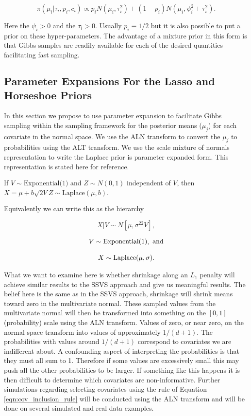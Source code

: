 \begin{equation}
\pi(\mu_i\vert \tau_i, p_i, c_i) \propto p_iN(\mu_i, \tau_i^2)+(1-p_i)N(\mu_i, \psi^2_i+\tau_i^2).
\end{equation}

Here the $\psi_i >0$ and the $\tau_i>0$. Usually $p_i\equiv1/2$ but it is also possible to put a prior on these hyper-parameters. The advantage of a mixture prior in this form is that Gibbs samples are readily available for each of the desired quantities facilitating fast sampling.     

\subsection{Parameter Expansions For the Lasso and Horseshoe Priors}
In this section we propose to use parameter expansion to facilitate Gibbs sampling within the sampling framework for the posterior means ($\mu_j$) for each covariate in the normal space. We use the ALN transform to convert the $\mu_j$ to probabilities using the ALT transform. 
We use the scale mixture of normals representation to write the Laplace prior is parameter expanded form. This representation is stated here for reference.

If $V \sim \text{Exponential(1)}$ and $Z \sim N(0, 1)$ independent of $V$, then $X = \mu + b \sqrt{2 V}Z \sim \mathrm{Laplace}(\mu,b)$. 

Equivalently we can write this as the hierarchy

\begin{equation}\label{eqn:normal_cond_lhood_lasso}
X \vert V \sim N[\mu, \sigma^22V],
\end{equation}

\begin{equation}\newnot{symbol:exponential_dist}
V \sim \text{Exponential}(1), \text{ and}
\end{equation}

\begin{equation}\newnot{symbol:laplace_dist}
X \sim \text{Laplace}(\mu, \sigma).
\end{equation}

What we want to examine here is whether shrinkage along an $L_1$ penalty will achieve similar results to the SSVS approach and give us meaningful results. The belief here is the same as in the SSVS approach, shrinkage will shrink means toward zero in the multivariate normal. These sampled values from the multivariate normal will then be transformed into something on the $[0,1]$ (probability) scale using the ALN transform. Values of zero, or near zero, on the normal space transform into values of approximately $1/(d+1)$. The probabilities with values around $1/(d+1)$ correspond to covariates we are indifferent about. A confounding aspect of interpreting the probabilities is that they must all sum to 1. Therefore if some values are excessively small this may push all the other probabilities to be larger. If something like this happens it is then difficult to determine which covariates are non-informative. Further simulations regarding selecting covariates using the rule of Equation \ref{eqn:cov_inclusion_rule} will be conducted using the ALN transform and will be done on several simulated and real data examples.    

